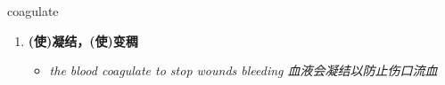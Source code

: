 
\begin{frame}
{\huge coagulate}
\begin{center}
\begin{enumerate}\Large
  \item \textbf{(使)凝结，(使)变稠}
  \begin{itemize}
    \item \em{\Large{the blood coagulate to stop wounds bleeding 血液会凝结以防止伤口流血}}
  \end{itemize}
\end{enumerate}
\end{center}
\end{frame}
